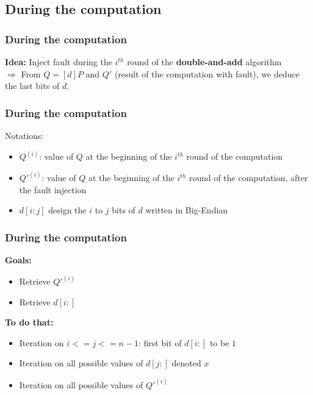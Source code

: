 \documentclass{beamer}
\begin{document}
    \subsection{During the computation}
    \begin{frame}
        \frametitle{During the computation}
        {\bf Idea: } Inject fault during the $i^{th}$ round of the {\bf double-and-add} algorithm \\

        $\Rightarrow$ From $Q = [d]P$ and $Q'$ (result of the computation with fault), we deduce the last bits of $d$.

    \end{frame}
    
    \begin{frame}
        \frametitle{During the computation}
        Notations:
        \begin{itemize}
            \item $Q^{(i)}$: value of $Q$ at the beginning of the $i^{th}$ round of the computation
            \item $Q'^{(i)}$: value of $Q$ at the beginning of the $i^{th}$ round of the computation, after the fault injection
            \item $d[i:j]$ design the $i$ to $j$ bits of $d$ written in Big-Endian
        \end{itemize}

    \end{frame}
    
    \begin{frame}
        \frametitle{During the computation}
       
        {\bf Goals:}
        \begin{itemize}
            \item \color{black} { Retrieve $Q'^{(i)}$}
            \item \color{black} { Retrieve $d[i:]$ }
        \end{itemize}

        {\bf To do that:}
        \begin{itemize}
            \item \color{black} { Iteration on  $i <= j <= n-1$: first bit of $d[i:]$ to be $1$}
            \item \color{black} { Iteration on all possible values of $d[j:]$ denoted $x$}
            \item \color{black} { Iteration on all possible values of $Q'^{(i)}$}
        \end{itemize}
    \end{frame}
    
\end{document}
